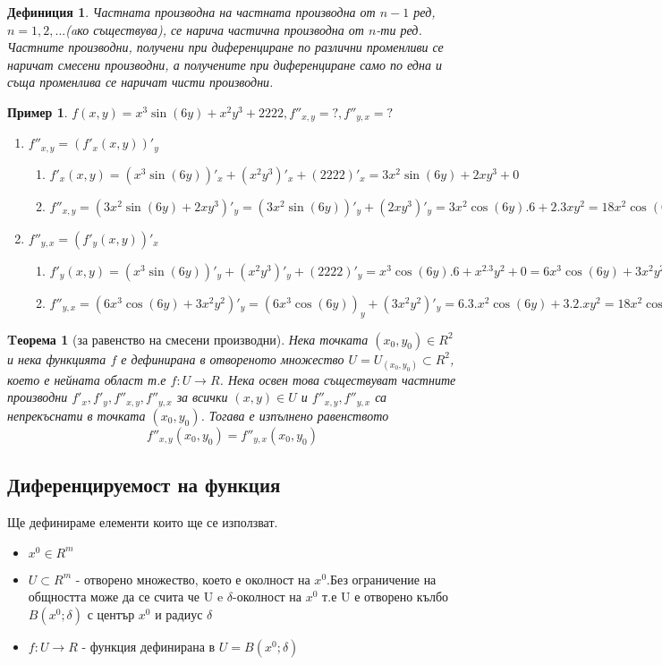 \documentclass[fleqn]{article}
\newtheorem{theorem}{Tеорема}[subsection]
\newtheorem{example}{Пример}[subsection]
\newtheorem{definition}{Дефиниция}[subsection]
\begin{document}
\begin{definition}
Частната производна на частната производна от $n-1$ ред, $n = 1, 2, ...$(aко съществува), се нарича частична производна от $n$-ти ред. Частните производни, получени при диференциране по различни променливи се наричат смесени производни, а получените при диференциране само по една и съща променлива се наричат чисти производни. 
\end{definition}

\begin{example}
$f(x,y) = x^3\sin(6y) + x^2y^3 + 2222, f''_{x,y} = ?, f''_{y,x} = ?$
	\begin{enumerate}
	\item $f''_{x,y} = (f'_x(x,y))'_y$\\
		\begin{enumerate}
			\item$f'_x(x,y) =(x^3\sin(6y))'_x + (x^2y^3)'_x + (2222)'_x = 3x^2 \sin(6y) + 2xy^3 + 0 $
			\item$f''_{x,y} = (3x^2 \sin(6y) + 2xy^3)'_y = (3x^2 \sin(6y))'_y + (2xy^3)'_y  =3x^2 \cos(6y).6 + 2.3xy^2 = 18x^2\cos(6y) + 6xy^2$
		\end{enumerate}
	\item $f''_{y,x} = (f'_y(x,y))'_x$
		\begin{enumerate}
			\item $f'_y (x,y) =(x^3\sin(6y))'_y + (x^2y^3)'_y + (2222)'_y = x^3 \cos(6y).6 + x^2.3y^2 + 0 = 6x^3 \cos(6y) + 3x^2y^2 $ 
			\item $f''_{y,x} = (6x^3 \cos(6y) + 3x^2y^2)'_y = (6x^3 \cos(6y))_y + (3x^2y^2)'_y = 6.3.x^2 \cos(6y) + 3.2.xy^2 = 18x^2\cos(6y) + 6xy^2 $
		\end{enumerate}
	\end{enumerate}
\end{example}

\begin{theorem}[за равенство на смесени производни]
Нека точката $(x_0, y_0) \in R^2$ и нека функцията $f$ е дефинирана в отвореното множество $U=U_{(x_0, y_0)} \subset R^2$, което е нейната област т.е $f: U \rightarrow R$. Нека освен това съществуват частните производни $f'_x, f'_y,f''_{x,y},f''_{y,x}$ за всички $(x, y)\in U$ и $f''_{x,y},f''_{y,x}$ са непрекъснати в точката $(x_0, y_0)$. Тогава е изпълнено равенството 
$$f''_{x,y}(x_0, y_0) = f''_{y,x}(x_0, y_0)$$
\end{theorem}
\subsection{Диференцируемост на функция}
Ще дефинираме елементи които ще се използват. 
\begin{itemize}
	\item $x^0 \in R^m$
	\item $U \subset R^m$ - отворено множество, което е околност на $x^0$.Без ограничение на общността може да се счита че U e $\delta$-околност на $x^0$ т.е U е отворено кълбо $B(x^0;\delta)$ с център $x^0$ и радиус $\delta$
	\item $f: U \rightarrow R$ - функция дефинирана в $U = B(x^0;\delta) $
\end{itemize}
\end{document}
